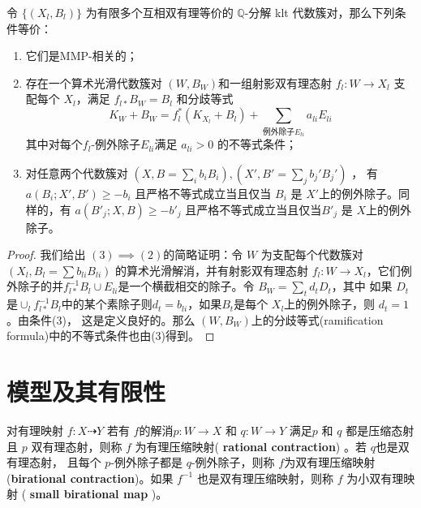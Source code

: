 \begin{lemma}\label{MMPrelatedConditation}
  \cite[Proposition 3.4]{brunoLogSarkisovProgram1995}
  令 $ \{(X_l,B_l)\} $ 为有限多个互相双有理等价的 $ \mathbb{Q} $-分解 klt 代数簇对，那么下列条件等价：
  \begin{enumerate}
    \item 它们是MMP-相关的；
    \item 存在一个算术光滑代数簇对 $ (W,B_W) $和一组射影双有理态射  $ f_l:W\to  X_l $ 支配每个 $ X_l $，满足 $ f_{l*}B_W=B_l $ 和分歧等式
      \[ K_W+B_W=f_l^*(K_{X_l}+B_l)+\sum_{\text{例外除子}E_{li}}{a_{li}E_{li}} \]
          其中对每个$ f_l $-例外除子$E_{li}$满足 $a_{li}>0$ 的不等式条件；
    \item 对任意两个代数簇对 $ (X,B=\sum_ib_{i }B_i),(X',B'=\sum_{j}b_{j}'B_{j}') $ ， 有  $ a(B_i;X',B')\geqslant -b_i $ 且严格不等式成立当且仅当 $ B_i $ 是 $ X' $上的例外除子。同样的，有 $ a(B'_j;X,B)\geqslant -b'_j $ 且严格不等式成立当且仅当$ B'_j $ 是 $ X $上的例外除子。
  \end{enumerate}
\end{lemma}
\begin{proof}
  我们给出  $(3) \implies (2)$的简略证明：令 $W$ 为支配每个代数簇对 $(X_l,B_l=\sum b_{li}B_{li})$ 的算术光滑解消，并有射影双有理态射 $f_l:W\to X_l$，它们例外除子的并$f_{l*}^{-1}B_l\cup E_{li}$是一个横截相交的除子。令 $B_W=\sum_t d_tD_t $，其中  如果 $D_t$ 是$\cup_l f_{l*}^{-1}B_l$中的某个素除子则$d_t = b_{li}$，如果$B_{t}$是每个 $X_{l}$上的例外除子，则  $d_t=1$。由条件(3)， 这是定义良好的。那么 $(W,B_{W})$上的分歧等式(ramification formula)中的不等式条件也由(3)得到。
\end{proof}

\section{模型及其有限性}

\begin{definition}
  \cite[\S 2]{haconSarkisovProgram2012} 对有理映射 $f:X\dashrightarrow Y$  若有 $f$的解消$p:W\to X$ 和 $q:W\to Y$ 满足$p$  和 $q$ 都是压缩态射且 $p$ 双有理态射，则称 $f$ 为有理压缩映射( \textbf{rational contraction})  。若 $ q$也是双有理态射， 且每个 $p$-例外除子都是 $q$-例外除子，则称 $f$为双有理压缩映射 (\textbf{birational contraction})。如果 $f^{-1}$ 也是双有理压缩映射，则称 $f$ 为小双有理映射   ( \textbf{small birational map} )。
\end{definition}

